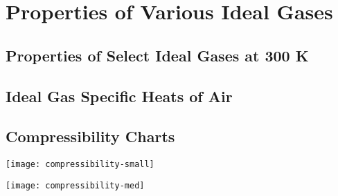 \chapter{Properties of Various Ideal Gases}
\section{Properties of Select Ideal Gases at 300 K} \label{sec:idealGasProps}

\section[Ideal Gas Specific Heats of Air]{Ideal Gas Specific Heats of Air\footnotemark[1]} \label{sec:idealGasAir}

\restoregeometry

\section{Compressibility Charts}
\begin{center}
  \texttt{[image: compressibility-small]}
\end{center}
\begin{center}
  \texttt{[image: compressibility-med]}
\end{center}
\restoregeometry


